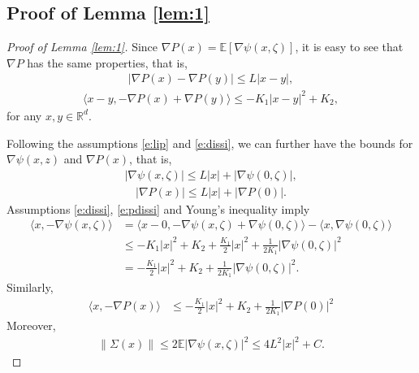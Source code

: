 \documentclass[12pt]{amsart}
\theoremstyle{definition}
\theoremstyle{remark}
\numberwithin{equation}{section}
\newcommand{\E}{\mathbb{E}}            %
\newcommand{\Ll}{\langle}
\newcommand{\Rr}{\rangle}
\newcommand{\R}{\mathbb{R}}\newcommand{\RR}{\mathbb{R}}
\begin{document}
\begin{appendix}



\section{Proof of Lemma \ref{lem:1}}\label{appen:lem1}
\begin{proof}[Proof of Lemma \ref{lem:1}]
	Since $\nabla P(x)=\E[\nabla\psi(x,\zeta)]$, it is easy to see that $\nabla P$ has the same properties, that is,
	\begin{eqnarray*}
		|\nabla P(x)-\nabla P(y)|\le L|x-y|,
	\end{eqnarray*}
	\begin{eqnarray*}
		\Ll x-y,-\nabla P(x)+\nabla P(y)\Rr\le -K_1|x-y|^2+K_2,
	\end{eqnarray*}
	for any $x,y\in \R^d$.
	
	Following the assumptions \eqref{e:lip} and \eqref{e:dissi}, we can further have the bounds for $\nabla \psi(x,z)$ and $\nabla P(x)$, that is,
	\begin{eqnarray*}
		|\nabla\psi(x,\zeta)|\le L|x|+|\nabla\psi(0,\zeta)|,
	\end{eqnarray*} 
	\begin{eqnarray*}
		|\nabla P(x)|\le L|x|+|\nabla P(0)|.
	\end{eqnarray*}
	Assumptions \eqref{e:dissi}, \eqref{e:pdissi} and Young's inequality imply
	\begin{align}\label{e:psibound2}
		\Ll x, -\nabla \psi(x,\zeta)\Rr&=\Ll x-0, -\nabla \psi(x,\zeta)+\nabla \psi(0,\zeta)\Rr- \Ll x, \nabla \psi(0,\zeta)\Rr   \nonumber \\
		&\le-K_1|x|^2+K_2+\frac{K_1}{2}|x|^2+\frac{1}{2K_1}|\nabla\psi(0,\zeta)|^2 \nonumber\\
		&=-\frac{K_1}{2}|x|^2+K_2+\frac{1}{2K_1}|\nabla\psi(0,\zeta)|^2.
	\end{align}
	Similarly,	
	\begin{align}\label{e:pbound2}
		\Ll x, -\nabla P(x)\Rr
		&\le -\frac{K_1}{2}|x|^2+K_2+\frac{1}{2K_1}|\nabla P(0)|^2
	\end{align}
	Moreover,
	\begin{eqnarray}\label{e:sbound}
		\|\Sigma(x)\|\le 2\E|\nabla\psi(x,\zeta)|^2\le 4L^2|x|^2+C.
	\end{eqnarray}
	

\end{proof}
\end{appendix}
\end{document}
